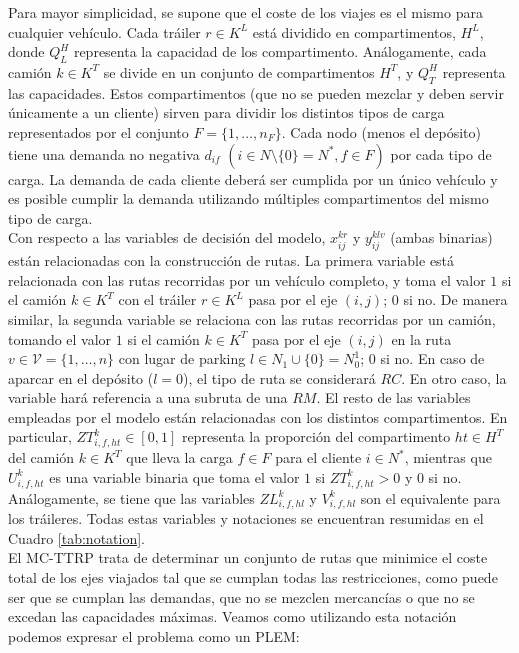 Para mayor simplicidad, se supone que el coste de los viajes es el mismo para cualquier vehículo. Cada tráiler $r\in K^L$ está dividido en compartimentos, $H^L$, donde $Q_L^H$ representa la capacidad de los compartimento. Análogamente, cada camión $k\in K^T$ se divide en un conjunto de compartimentos $H^T$, y $Q_T^H$ representa las capacidades. Estos compartimentos (que no se pueden mezclar y deben servir únicamente a un cliente) sirven para dividir los distintos tipos de carga representados por el conjunto $F=\{1,\ldots,n_F\}$. Cada nodo (menos el depósito) tiene una demanda no negativa $d_{if}$ $(i\in N\setminus\{0\}=N^*,f\in F)$ por cada tipo de carga. La demanda de cada cliente deberá ser cumplida por un único vehículo y es posible cumplir la demanda utilizando múltiples compartimentos del mismo tipo de carga.\\

Con respecto a las variables de decisión del modelo, $x_{ij}^{kr}$ y $y_{ij}^{klv}$ (ambas binarias) están relacionadas con la construcción de rutas. La primera variable está relacionada con las rutas recorridas por un vehículo completo, y toma el valor $1$ si el camión $k\in K^T$ con el tráiler $r\in K^L$ pasa por el eje $(i,j)$; 0 si no. De manera similar, la segunda variable se relaciona con las rutas recorridas por un camión, tomando el valor $1$ si el camión $k\in K^T$ pasa por el eje $(i,j)$ en la ruta $v\in\mathcal{V}=\{1,\ldots,n\}$ con lugar de parking $l\in N_1\cup\{0\}=N_0^1$; 0 si no. En caso de aparcar en el depósito ($l=0$), el tipo de ruta se considerará $RC$. En otro caso, la variable hará referencia a una subruta de una $RM$. El resto de las variables empleadas por el modelo están relacionadas con los distintos compartimentos. En particular, $ZT^k_{i,f,ht}\in[0,1]$ representa la proporción del compartimento $ht\in H^T$ del camión $k\in K^T$ que lleva la carga $f\in F$ para el cliente $i\in N^*$, mientras que $U_{i,f,ht}^k$ es una variable binaria que toma el valor $1$ si $ZT^k_{i,f,ht}>0$ y 0 si no. Análogamente, se tiene que las variables $ZL^k_{i,f,hl}$ y $V_{i,f,hl}^k$ son el equivalente para los tráileres. Todas estas variables y notaciones se encuentran resumidas en el Cuadro \ref{tab:notation}.\\

El MC-TTRP trata de determinar un conjunto de rutas que minimice el coste total de los ejes viajados tal que se cumplan todas las restricciones, como puede ser que se cumplan las demandas, que no se mezclen mercancías o que no se excedan las capacidades máximas. Veamos como utilizando esta notación podemos expresar el problema como un PLEM:

